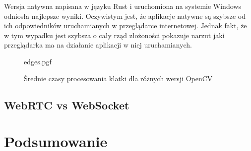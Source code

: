 \documentclass[language=polish,type=master]{aghmodern}
\begin{document}
Wersja natywna napisana w języku Rust i uruchomiona na systemie Windows odniosła najlepsze wyniki.
Oczywistym jest, że aplikacje natywne są szybsze od ich odpowiedników uruchamianych w przeglądarce internetowej.
Jednak fakt, że w tym wypadku jest szybsza o cały rząd złożoności pokazuje narzut jaki przeglądarka ma na działanie aplikacji w niej uruchamianych.

\begin{figure}[H]
    \centering
    {edges.pgf}
    \caption{Średnie czasy procesowania klatki dla różnych wersji OpenCV}
    \label{fig:edges}
\end{figure}

\section{WebRTC vs WebSocket}

\chapter{Podsumowanie}

\backmatter

\cleardoublepage
\renewcommand\listoflistingscaption{Spis listingów}
\listoflistings

\cleardoublepage
\listoffigures

\cleardoublepage
\printbibliography
\end{document}
